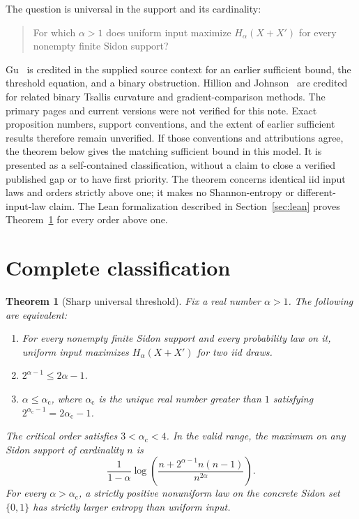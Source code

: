 \documentclass[11pt,a4paper]{article}
\newtheorem{theorem}{Theorem}
\newcommand{\crit}{\alpha_{\mathrm c}}
\begin{document}
The question is universal in the support and its cardinality:
\begin{quote}
For which $\alpha>1$ does uniform input maximize $H_\alpha(X+X')$
for every nonempty finite Sidon support?
\end{quote}

Gu~\cite{Gu} is credited in the supplied source context for an earlier
sufficient bound, the threshold equation, and a binary obstruction.
Hillion and Johnson~\cite{HJ} are credited for related binary Tsallis curvature
and gradient-comparison methods. The primary pages and current versions were
not verified for this note. Exact proposition numbers, support conventions,
and the extent of earlier sufficient results therefore remain unverified.
If those conventions and attributions agree, the theorem below gives the
matching sufficient bound in this model. It is presented as a self-contained
classification, without a claim to close a verified published gap or to have
first priority. The theorem concerns identical iid input laws and orders
strictly above one; it makes no Shannon-entropy or different-input-law claim.
The Lean formalization described in Section~\ref{sec:lean} proves
Theorem~\ref{thm:main} for every order above one.

\section{Complete classification}

\begin{theorem}[Sharp universal threshold]\label{thm:main}
Fix a real number $\alpha>1$. The following are equivalent:
\begin{enumerate}[label=(\roman*),nosep]
\item For every nonempty finite Sidon support and every probability law
on it, uniform input maximizes $H_\alpha(X+X')$ for two iid draws.
\item $2^{\alpha-1}\le 2\alpha-1$.
\item $\alpha\le\crit$, where $\crit$ is the unique real number greater
than $1$ satisfying $2^{\crit-1}=2\crit-1$.
\end{enumerate}
The critical order satisfies $3<\crit<4$. In the valid range, the maximum
on any Sidon support of cardinality $n$ is
\begin{equation}\label{eq:max}
\frac{1}{1-\alpha}\log\left(
\frac{n+2^{\alpha-1}n(n-1)}{n^{2\alpha}}\right).
\end{equation}
For every $\alpha>\crit$, a strictly positive nonuniform law on the concrete
Sidon set $\{0,1\}$ has strictly larger entropy than uniform input.
\end{theorem}
\end{document}
